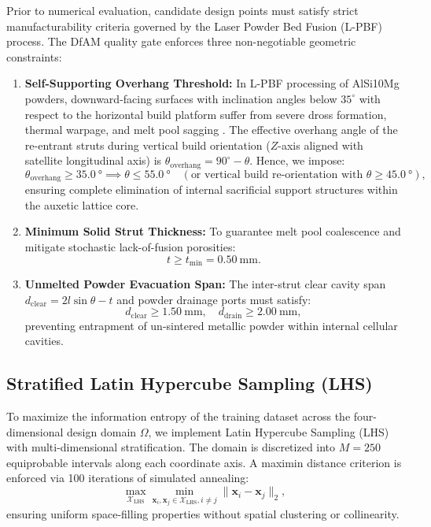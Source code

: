 Prior to numerical evaluation, candidate design points must satisfy strict manufacturability criteria governed by the Laser Powder Bed Fusion (L-PBF) process. The DfAM quality gate enforces three non-negotiable geometric constraints:
\begin{enumerate}
\item \textbf{Self-Supporting Overhang Threshold:} In L-PBF processing of AlSi10Mg powders, downward-facing surfaces with inclination angles below $35^\circ$ with respect to the horizontal build platform suffer from severe dross formation, thermal warpage, and melt pool sagging \cite{khan2024}. The effective overhang angle of the re-entrant struts during vertical build orientation ($Z$-axis aligned with satellite longitudinal axis) is $\theta_{\text{overhang}} = 90^\circ - \theta$. Hence, we impose:
\begin{equation}
\theta_{\text{overhang}} \ge \SI{35.0}{\degree} \implies \theta \le \SI{55.0}{\degree} \quad (\text{or vertical build re-orientation with } \theta \ge \SI{45.0}{\degree}),
\label{eq:dfam_overhang_gate}
\end{equation}
ensuring complete elimination of internal sacrificial support structures within the auxetic lattice core.
\item \textbf{Minimum Solid Strut Thickness:} To guarantee melt pool coalescence and mitigate stochastic lack-of-fusion porosities:
\begin{equation}
t \ge t_{\text{min}} = \SI{0.50}{\milli\meter}.
\label{eq:dfam_thickness_gate}
\end{equation}
\item \textbf{Unmelted Powder Evacuation Span:} The inter-strut clear cavity span $d_{\text{clear}} = 2 l \sin\theta - t$ and powder drainage ports must satisfy:
\begin{equation}
d_{\text{clear}} \ge \SI{1.50}{\milli\meter}, \quad d_{\text{drain}} \ge \SI{2.00}{\milli\meter},
\label{eq:dfam_drain_gate}
\end{equation}
preventing entrapment of un-sintered metallic powder within internal cellular cavities.
\end{enumerate}

\subsection{Stratified Latin Hypercube Sampling (LHS)}

To maximize the information entropy of the training dataset across the four-dimensional design domain $\Omega$, we implement Latin Hypercube Sampling (LHS) with multi-dimensional stratification. The domain is discretized into $M = 250$ equiprobable intervals along each coordinate axis. A maximin distance criterion is enforced via 100 iterations of simulated annealing:
\begin{equation}
\max_{\mathcal{X}_{\text{LHS}}} \min_{\mathbf{x}_i, \mathbf{x}_j \in \mathcal{X}_{\text{LHS}}, i \ne j} \|\mathbf{x}_i - \mathbf{x}_j\|_2,
\label{eq:maximin_criterion}
\end{equation}
ensuring uniform space-filling properties without spatial clustering or collinearity.

